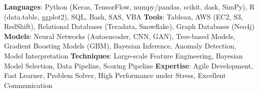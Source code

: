 

\begin{cvparagraph}
{\textbf{Languages}: Python (Keras, TensorFlow, numpy/pandas, scikit, dask, SimPy), R (data.table, ggplot2), SQL, Bash, SAS, VBA}\newline
{\textbf{Tools}: Tableau, AWS (EC2, S3, RedShift), Relational Databases (Teradata, Snowflake), Graph Databases (Neo4j)}\newline
{\textbf{Models}: Neural Networks (Autoencoder, CNN, GAN), Tree-based Models, Gradient Boosting Models (GBM), Bayesian Inference, Anomaly Detection, Model Interpretation}\newline
{\textbf{Techniques}: Large-scale Feature Engineering, Bayesian Model Selection, Data Pipeline, Scoring Pipeline}\newline
{\textbf{Expertise}: Agile Development, Fast Learner, Problem Solver, High Performance under Stress, Excellent Communication}
\end{cvparagraph}
